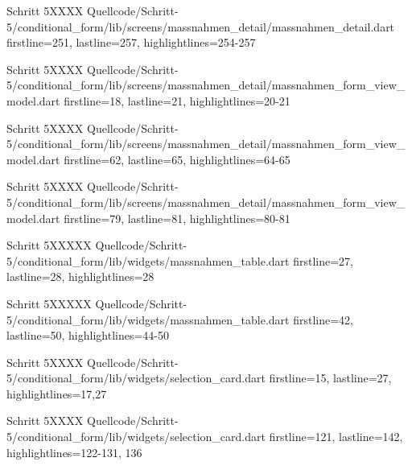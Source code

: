   \begin{alexlisting}{Schritt 5}{XXXX}
    {Quellcode/Schritt-5/conditional_form/lib/screens/massnahmen_detail/massnahmen_detail.dart}
    {firstline=251, lastline=257, highlightlines={254-257}}
    \label{lst:Schritt5XXXXX}
  \end{alexlisting}


  \begin{alexlisting}{Schritt 5}{XXXX}
    {Quellcode/Schritt-5/conditional_form/lib/screens/massnahmen_detail/massnahmen_form_view_model.dart}
    {firstline=18, lastline=21, highlightlines={20-21}}
    \label{lst:Schritt5XXXXX}
  \end{alexlisting}

  \begin{alexlisting}{Schritt 5}{XXXX}
    {Quellcode/Schritt-5/conditional_form/lib/screens/massnahmen_detail/massnahmen_form_view_model.dart}
    {firstline=62, lastline=65, highlightlines={64-65}}
    \label{lst:Schritt5XXXXX}
  \end{alexlisting}

  \begin{alexlisting}{Schritt 5}{XXXX}
    {Quellcode/Schritt-5/conditional_form/lib/screens/massnahmen_detail/massnahmen_form_view_model.dart}
    {firstline=79, lastline=81, highlightlines={80-81}}
    \label{lst:Schritt5XXXXX}
  \end{alexlisting}

  \begin{alexlisting}{Schritt 5}{XXXXX}
    {Quellcode/Schritt-5/conditional_form/lib/widgets/massnahmen_table.dart}
    {firstline=27, lastline=28, highlightlines={28}}
    \label{lst:Schritt5XXXXX}
  \end{alexlisting}

  \begin{alexlisting}{Schritt 5}{XXXXX}
    {Quellcode/Schritt-5/conditional_form/lib/widgets/massnahmen_table.dart}
    {firstline=42, lastline=50, highlightlines={44-50}}
    \label{lst:Schritt5XXXXX}
  \end{alexlisting}

  \begin{alexlisting}{Schritt 5}{XXXX}
    {Quellcode/Schritt-5/conditional_form/lib/widgets/selection_card.dart}
    {firstline=15, lastline=27, highlightlines={17,27}}
    \label{lst:Schritt5XXXX}
\end{alexlisting}

\begin{alexlisting}{Schritt 5}{XXXX}
    {Quellcode/Schritt-5/conditional_form/lib/widgets/selection_card.dart}
    {firstline=121, lastline=142, highlightlines={122-131, 136}}
    \label{lst:Schritt5XXXX}
\end{alexlisting}

\ifincludeall \clearpage \fi 
